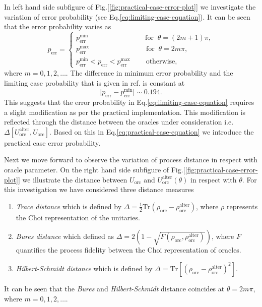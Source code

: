 In left hand side subfigure of Fig.[\ref{fig:practical-case-error-plot}] we investigate the variation of error probability (see Eq.\eqref{eq:limiting-case-equation}). It can be seen that the error probability varies as
\[
p_\textrm{err} = 
\begin{cases}
p_\textrm{err}^\textrm{min}\;\;\;\;\;\;\;\;\;\;\;\;\;\;\;\;\;\;\;\;\;\;\;\;\;\;\;\;\; \textrm{for}\;\; \theta = (2m+1)\pi,\\

p_\textrm{err}^\textrm{max} \;\;\;\;\;\;\;\;\;\;\;\;\;\;\;\;\;\;\;\;\;\;\;\;\;\;\;\;\; \textrm{for}\;\; \theta = 2m\pi,\\

p_\textrm{err}^\textrm{min}<p_\textrm{err} <p_\textrm{err}^\textrm{max}\;\;\;\;\;\;\;\; \textrm{otherwise},
\end{cases}
\]
where $m=0,1,2,\ldots$. The difference in minimum error probability and the limiting case probability that is given in ref.\cite{chiribella2019quantum} is constant at
\begin{equation}
\lvert p_\textrm{err}-p_\textrm{err}^\textrm{min}\rvert\sim 0.194. 
\end{equation}
This suggests that the error probability in Eq.\eqref{eq:limiting-case-equation} requires a slight modification as per the practical implementation. This modification is reflected through the distance between the oracles under consideration i.e. $\Delta\left[U_\textrm{orc}^\textrm{alter},U_\textrm{orc}\right]$. Based on this in Eq.\eqref{eq:practical-case-equation} we introduce the practical case error probability.

Next we move forward to observe the variation of process distance in respect with oracle parameter. On the right hand side subfigure of Fig.[\ref{fig:practical-case-error-plot}] we illustrate the distance between $U_\textrm{orc}$ and $U_\textrm{orc}^\textrm{alter}(\theta)$ in respect with $\theta$. For this investigation we have considered three distance measures
\begin{enumerate}[noitemsep]
    \item \textit{Trace distance} which is defined by $\Delta = \frac{1}{2}\textrm{Tr}\left(\rho_\textrm{orc}-\rho_\textrm{orc}^\textrm{alter}\right)$, where $\rho$ represents the Choi representation of the unitaries.
    \item \textit{Bures distance} which defined as $\Delta = 2\left(1-\sqrt{F(\rho_\textrm{orc},\rho_\textrm{orc}^\textrm{alter})}\right)$, where $F$ quantifies the process fidelity between the Choi representation of oracles.
    \item \textit{Hilbert-Schmidt distance} which is defined by $\Delta = \textrm{Tr}\left[\left(\rho_\textrm{orc} - \rho_\textrm{orc}^\textrm{alter}\right)^2\right]$.
\end{enumerate}
It can be seen that the \textit{Bures} and \textit{Hilbert-Schmidt} distance coincides at $\theta=2m\pi$, where $m=0,1,2,\ldots$. 

